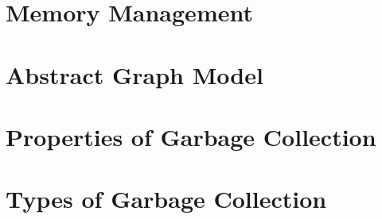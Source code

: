 \section{Memory Management}
\section{Abstract Graph Model}
\section{Properties of Garbage Collection}
\section{Types of Garbage Collection}
